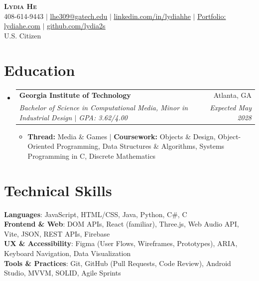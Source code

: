 \documentclass[letterpaper,11pt]{article}
\makeatletter
\newcommand{\resumeItem}[1]{
  \item\small{
    {#1 \vspace{-2pt}}
  }
}
\newcommand{\resumeSubheading}[4]{
  \vspace{-2pt}\item
    \begin{tabular*}{0.97\textwidth}[t]{l@{\extracolsep{\fill}}r}
      \textbf{#1} & #2 \\
      \textit{\small#3} & \textit{\small #4} \\
    \end{tabular*}\vspace{-7pt}
}
\newcommand{\resumeSubHeadingListStart}{\begin{itemize}[leftmargin=0.15in, label={}]}
\newcommand{\resumeSubHeadingListEnd}{\end{itemize}}
\newcommand{\resumeItemListStart}{\begin{itemize}}
\newcommand{\resumeItemListEnd}{\end{itemize}\vspace{-5pt}}
\makeatother
\begin{document}
\begin{center}
    \textbf{\Huge \scshape Lydia He} \\ \vspace{1pt}
    \small 408-614-9443 $|$ \href{mailto:lhe309@gatech.edu}{\underline{lhe309@gatech.edu}} $|$
    \href{https://www.linkedin.com/in/lydiahhe}{\underline{linkedin.com/in/lydiahhe}} $|$
    \href{https://lydiahe.com}{\underline{Portfolio: lydiahe.com}} $|$
    \href{https://github.com/lydia2s}{\underline{github.com/lydia2s}} \\ \vspace{2pt}
    \small U.S. Citizen
\end{center}


\section{Education}
  \resumeSubHeadingListStart
    \resumeSubheading
      {Georgia Institute of Technology}{Atlanta, GA}
      {Bachelor of Science in Computational Media, Minor in Industrial Design $|$ GPA: 3.62/4.00}{Expected May 2028}
      \resumeItemListStart
        \resumeItem{\textbf{Thread:} Media \& Games $|$ \textbf{Coursework:} Objects \& Design, Object-Oriented Programming, Data Structures \& Algorithms, Systems Programming in C, Discrete Mathematics}
      \resumeItemListEnd
  \resumeSubHeadingListEnd


\section{Technical Skills}
 \begin{itemize}[leftmargin=0.15in, label={}]
    \small{\item{
     \textbf{Languages}{: JavaScript, HTML/CSS, Java, Python, C\#, C} \\
     \textbf{Frontend \& Web}{: DOM APIs, React (familiar), Three.js, Web Audio API, Vite, JSON, REST APIs, Firebase} \\
     \textbf{UX \& Accessibility}{: Figma (User Flows, Wireframes, Prototypes), ARIA, Keyboard Navigation, Data Visualization} \\
     \textbf{Tools \& Practices}{: Git, GitHub (Pull Requests, Code Review), Android Studio, MVVM, SOLID, Agile Sprints}
    }}
 \end{itemize}


\end{document}
